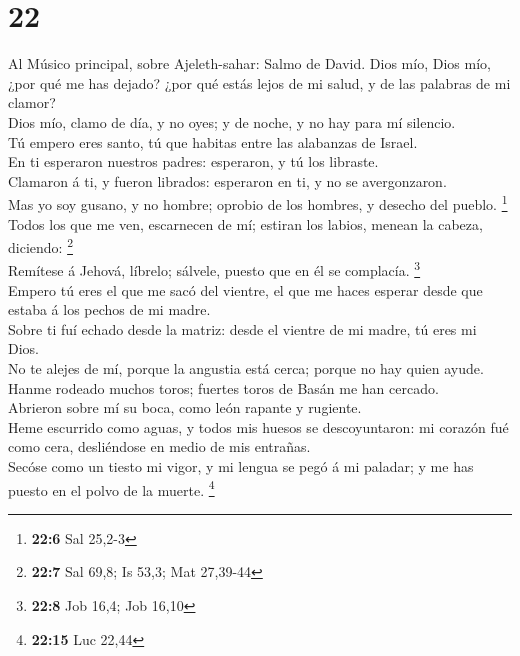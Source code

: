 \hypertarget{section-21}{%
\section{22}\label{section-21}}

 Al Músico principal, sobre Ajeleth-sahar: Salmo de David.
Dios mío, Dios mío, ¿por qué me has dejado? ¿por qué estás lejos de mi
salud, y de las palabras de mi clamor?\\
 Dios mío, clamo de día, y no oyes; y de noche, y no hay
para mí silencio.\\
 Tú empero eres santo, tú que habitas entre las alabanzas
de Israel.\\
 En ti esperaron nuestros padres: esperaron, y tú los
libraste.\\
 Clamaron á ti, y fueron librados: esperaron en ti, y no
se avergonzaron.\\
 Mas yo soy gusano, y no hombre; oprobio de los hombres, y
desecho del pueblo. \footnote{\textbf{22:6} Sal 25,2-3}\\
 Todos los que me ven, escarnecen de mí; estiran los
labios, menean la cabeza, diciendo: \footnote{\textbf{22:7} Sal 69,8; Is
  53,3; Mat 27,39-44}\\
 Remítese á Jehová, líbrelo; sálvele, puesto que en él se
complacía. \footnote{\textbf{22:8} Job 16,4; Job 16,10}\\
 Empero tú eres el que me sacó del vientre, el que me
haces esperar desde que estaba á los pechos de mi madre.\\
 Sobre ti fuí echado desde la matriz: desde el vientre de
mi madre, tú eres mi Dios.\\
 No te alejes de mí, porque la angustia está cerca;
porque no hay quien ayude.\\
 Hanme rodeado muchos toros; fuertes toros de Basán me
han cercado.\\
 Abrieron sobre mí su boca, como león rapante y
rugiente.\\
 Heme escurrido como aguas, y todos mis huesos se
descoyuntaron: mi corazón fué como cera, desliéndose en medio de mis
entrañas.\\
 Secóse como un tiesto mi vigor, y mi lengua se pegó á mi
paladar; y me has puesto en el polvo de la muerte. \footnote{\textbf{22:15}
  Luc 22,44}\\
